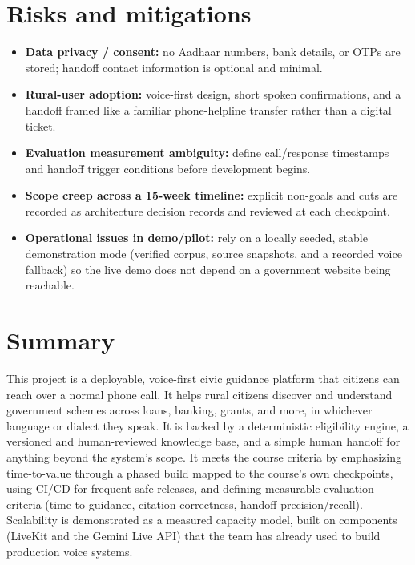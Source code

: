 \documentclass[11pt,a4paper]{article}
\begin{document}
\section{Risks and mitigations}
\begin{itemize}[leftmargin=0.7cm]
    \item \textbf{Data privacy / consent:} no Aadhaar numbers, bank details, or OTPs are stored; handoff contact information is optional and minimal.
    \item \textbf{Rural-user adoption:} voice-first design, short spoken confirmations, and a handoff framed like a familiar phone-helpline transfer rather than a digital ticket.
    \item \textbf{Evaluation measurement ambiguity:} define call/response timestamps and handoff trigger conditions before development begins.
    \item \textbf{Scope creep across a 15-week timeline:} explicit non-goals and cuts are recorded as architecture decision records and reviewed at each checkpoint.
    \item \textbf{Operational issues in demo/pilot:} rely on a locally seeded, stable demonstration mode (verified corpus, source snapshots, and a recorded voice fallback) so the live demo does not depend on a government website being reachable.
\end{itemize}

\section{Summary}
This project is a deployable, voice-first civic guidance platform that citizens can reach over a normal phone call. It helps rural citizens discover and understand government schemes across loans, banking, grants, and more, in whichever language or dialect they speak. It is backed by a deterministic eligibility engine, a versioned and human-reviewed knowledge base, and a simple human handoff for anything beyond the system's scope. It meets the course criteria by emphasizing time-to-value through a phased build mapped to the course's own checkpoints, using CI/CD for frequent safe releases, and defining measurable evaluation criteria (time-to-guidance, citation correctness, handoff precision/recall). Scalability is demonstrated as a measured capacity model, built on components (LiveKit and the Gemini Live API) that the team has already used to build production voice systems.
\end{document}
